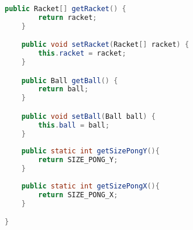 \begin{lstlisting}[language=Java]
	public Racket[] getRacket() {
		return racket;
	}

	public void setRacket(Racket[] racket) {
		this.racket = racket;
	}

	public Ball getBall() {
		return ball;
	}

	public void setBall(Ball ball) {
		this.ball = ball;
	}
	
	public static int getSizePongY(){
		return SIZE_PONG_Y;
	}
	
	public static int getSizePongX(){
		return SIZE_PONG_X;
	}

}

\end{lstlisting}
